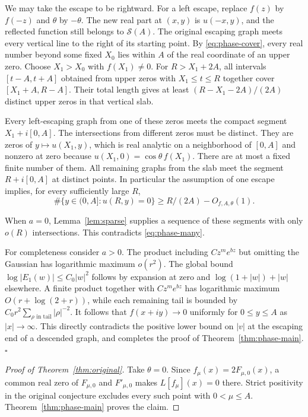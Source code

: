 \documentclass[11pt,a4paper]{article}
\numberwithin{equation}{section}
\begin{document}
We may take the escape to be rightward. For a left escape, replace $f(z)$ by
$f(-z)$ and $\theta$ by $-\theta$. The new real part at $(x,y)$ is
$u(-x,y)$, and the reflected function still belongs to $\mathcal S(A)$. The original escaping graph meets every vertical line to
the right of its starting point. By \eqref{eq:phase-cover}, every real
number beyond some fixed $X_0$ lies within $A$ of the real coordinate
of an upper zero. Choose $X_1>X_0$ with $f(X_1)\ne0$.
For $R>X_1+2A$, all intervals $[t-A,t+A]$ obtained from upper zeros
with $X_1\le t\le R$ together cover $[X_1+A,R-A]$. Their total
length gives at least $(R-X_1-2A)/(2A)$ distinct upper zeros in that
vertical slab.

Every left-escaping graph from one of these zeros meets the compact
segment $X_1+i[0,A]$. The intersections from different zeros must be
distinct. They are zeros of $y\mapsto u(X_1,y)$, which is real
analytic on a neighborhood of $[0,A]$ and nonzero at zero because
$u(X_1,0)=\cos\theta\,f(X_1)$. There are at most a fixed finite
number of them. All remaining graphs from the slab meet the segment
$R+i[0,A]$ at distinct points. In particular the assumption of one
escape implies, for every sufficiently large $R$,
\begin{equation}\label{eq:phase-many}
 \#\{y\in(0,A]:u(R,y)=0\}\ge R/(2A)-O_{f,A,\theta}(1).
\end{equation}


When $a=0$, Lemma~\ref{lem:sparse} supplies a sequence of these
segments with only $o(R)$ intersections. This contradicts
\eqref{eq:phase-many}.

For completeness consider $a>0$. The product including $Cz^m e^{bz}$
but omitting the Gaussian has logarithmic maximum $o(r^2)$.
The global bound $\log|E_1(w)|\le C_0|w|^2$ follows by expansion at zero
and $\log(1+|w|)+|w|$ elsewhere. A finite product together with
$Cz^m e^{bz}$ has logarithmic maximum $O(r+\log(2+r))$, while each
remaining tail is bounded by $C_0r^2\sum_{\rho\text{ in tail}}|\rho|^{-2}$.
It follows that $f(x+iy)\to0$ uniformly for $0\le y\le A$ as
$|x|\to\infty$. This directly contradicts the positive lower bound
on $|v|$ at the escaping end of a descended graph, and completes
the proof of Theorem~\ref{thm:phase-main}.\hfill$\square$

\begin{proof}[Proof of Theorem~\ref{thm:original}]
Take $\theta=0$. Since $f_\mu(x)=2F_{\mu,0}(x)$, a common real zero of
$F_{\mu,0}$ and $F'_{\mu,0}$ makes $L[f_\mu](x)=0$ there. Strict
positivity in the original conjecture excludes every such point with
$0<\mu\le A$. Theorem~\ref{thm:phase-main} proves the claim.
\end{proof}
\end{document}
